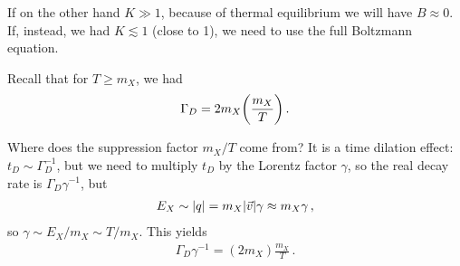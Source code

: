 \documentclass[main.tex]{subfiles}
\begin{document}

If on the other hand \(K \gg 1\), because of thermal equilibrium we will have \(B \approx 0\). 
If, instead, we had \(K \lesssim 1\) (close to 1), we need to use the full Boltzmann equation. 

Recall that for \(T \geq m_X\), we had 
%
\begin{align}
\Gamma _D = 2 m_X \qty( \frac{m_X}{T})
\,.
\end{align}

Where does the suppression factor \(m_X / T \) come from? 
It is a time dilation effect: \(t_D \sim \Gamma_D^{-1}\), but we need to multiply \(t_D\) by the Lorentz factor \(\gamma \), so the real decay rate is \(\Gamma _D \gamma^{-1} \), but 
%
\begin{align}
E_X \sim \abs{q} = m_X \abs{\vec{v}} \gamma \approx m_X \gamma 
\,,
\end{align}
%
so \(\gamma \sim E_X / m_X \sim T / m_X\). This yields 
%
\begin{align}
\Gamma _D \gamma^{-1} = (2 m_X) \frac{m_X}{T}
\,.
\end{align}
\end{document}
